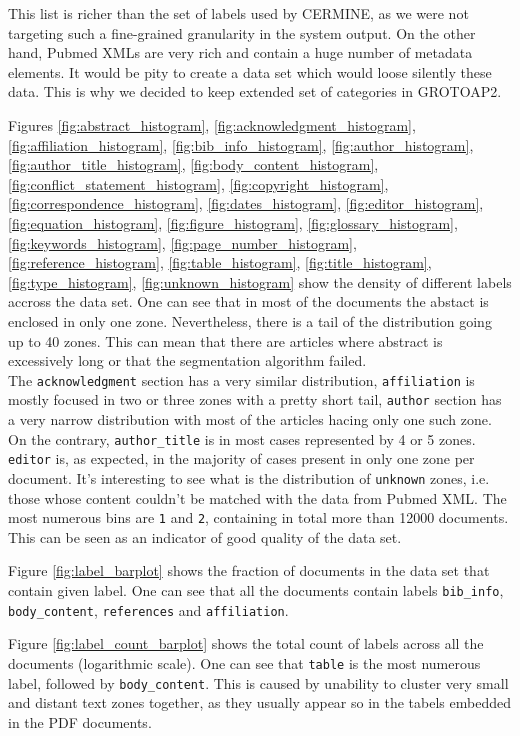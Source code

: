 This list is richer than the set of labels used by CERMINE, as we were not targeting such a fine-grained granularity in the system output. On the other hand, Pubmed XMLs are very rich and contain a huge number of metadata elements. It would be pity to create a data set which would loose silently these data. This is why we decided to keep extended set of categories in GROTOAP2.

Figures \ref{fig:abstract_histogram}, \ref{fig:acknowledgment_histogram}, \ref{fig:affiliation_histogram}, \ref{fig:bib_info_histogram}, \ref{fig:author_histogram}, \ref{fig:author_title_histogram}, \ref{fig:body_content_histogram}, \ref{fig:conflict_statement_histogram}, \ref{fig:copyright_histogram}, \ref{fig:correspondence_histogram}, \ref{fig:dates_histogram}, \ref{fig:editor_histogram}, \ref{fig:equation_histogram}, \ref{fig:figure_histogram}, \ref{fig:glossary_histogram}, \ref{fig:keywords_histogram}, \ref{fig:page_number_histogram}, \ref{fig:reference_histogram}, \ref{fig:table_histogram}, \ref{fig:title_histogram}, \ref{fig:type_histogram}, \ref{fig:unknown_histogram} show the density of different labels accross the data set. One can see that in most of the documents the abstact is enclosed in only one zone. Nevertheless, there is a tail of the distribution going up to 40 zones. This can mean that there are articles where abstract is excessively long or that the segmentation algorithm failed. \\

The \verb+acknowledgment+ section has a very similar distribution, \verb+affiliation+ is mostly focused in two or three zones with a pretty short tail, \verb+author+ section has a very narrow distribution with most of the articles hacing only one such zone. On the contrary, \verb+author_title+ is in most cases represented by 4 or 5 zones. \verb+editor+ is, as expected, in the majority of cases present in only one zone per document. It's interesting to see what is the distribution of \verb+unknown+ zones, i.e. those whose content couldn't be matched with the data from Pubmed XML. The most numerous bins are \verb+1+ and \verb+2+, containing in total more than 12000 documents. This can be seen as an indicator of good quality of the data set.

Figure \ref{fig:label_barplot} shows the fraction of documents in the data set that contain given label. One can see that all the documents contain labels \verb+bib_info+, \verb+body_content+, \verb+references+ and \verb+affiliation+.

Figure \ref{fig:label_count_barplot} shows the total count of labels across all the documents (logarithmic scale). One can see that \verb+table+ is the most numerous label, followed by \verb+body_content+. This is caused by unability to cluster very small and distant text zones together, as they usually appear so in the tabels embedded in the PDF documents.

